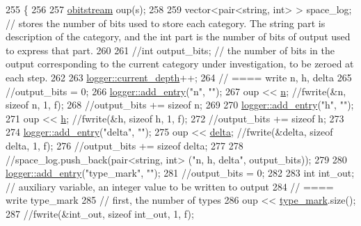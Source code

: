 \begin{DoxyCode}
255                                                   \{
256   
257   \hyperlink{classobitstream}{obitstream} oup(s);
258 
259   vector<pair<string, int> > space\_log; \textcolor{comment}{// stores the number of bits used to store each category. The
       string part is description of the category, and the int part is the number of bits of output used to express that
       part.}
260 
261   \textcolor{comment}{//int output\_bits; // the number of bits in the output corresponding to the current category under
       investigation, to be zeroed at each step.}
262 
263   \hyperlink{classlogger_a9d29b49bd318a719a8e85b59eac54fe0}{logger::current\_depth}++;
264   \textcolor{comment}{// ==== write n, h, delta}
265   \textcolor{comment}{//output\_bits = 0;}
266   \hyperlink{classlogger_a710163deb17bc81f70d53d285b8ac9ac}{logger::add\_entry}(\textcolor{stringliteral}{"n"}, \textcolor{stringliteral}{""});
267   oup << \hyperlink{classmarked__graph__compressed_a8d841016ddb11cfd33748c8deb6277ba}{n}; \textcolor{comment}{//fwrite(&n, sizeof n, 1, f);}
268   \textcolor{comment}{//output\_bits += sizeof n;}
269 
270   \hyperlink{classlogger_a710163deb17bc81f70d53d285b8ac9ac}{logger::add\_entry}(\textcolor{stringliteral}{"h"}, \textcolor{stringliteral}{""});
271   oup << \hyperlink{classmarked__graph__compressed_af6ff623407b673d08d0cab77b39c2193}{h}; \textcolor{comment}{//fwrite(&h, sizeof h, 1, f);}
272   \textcolor{comment}{//output\_bits += sizeof h;}
273 
274   \hyperlink{classlogger_a710163deb17bc81f70d53d285b8ac9ac}{logger::add\_entry}(\textcolor{stringliteral}{"delta"}, \textcolor{stringliteral}{""});
275   oup << \hyperlink{classmarked__graph__compressed_a8b2aaac68e9332ddc78d88eb60b323a7}{delta}; \textcolor{comment}{//fwrite(&delta, sizeof delta, 1, f);}
276   \textcolor{comment}{//output\_bits += sizeof delta;}
277 
278   \textcolor{comment}{//space\_log.push\_back(pair<string, int> ("n, h, delta", output\_bits));}
279 
280   \hyperlink{classlogger_a710163deb17bc81f70d53d285b8ac9ac}{logger::add\_entry}(\textcolor{stringliteral}{"type\_mark"}, \textcolor{stringliteral}{""});
281   \textcolor{comment}{//output\_bits = 0;}
282 
283   \textcolor{keywordtype}{int} int\_out; \textcolor{comment}{// auxiliary variable, an integer value to be written to output}
284   \textcolor{comment}{// ==== write type\_mark}
285   \textcolor{comment}{// first, the number of types}
286   oup <<  \hyperlink{classmarked__graph__compressed_a86b00223525703e973415cbc9c94da68}{type\_mark}.size();
287   \textcolor{comment}{//fwrite(&int\_out, sizeof int\_out, 1, f);}

\end{DoxyCode}
